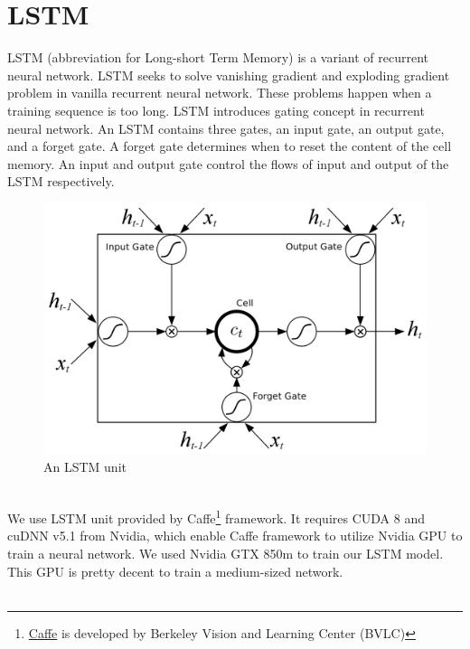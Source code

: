 \section{LSTM}
LSTM (abbreviation for Long-short Term Memory) is a variant of recurrent neural network. LSTM seeks to solve vanishing gradient and exploding gradient problem in vanilla recurrent neural network. These problems happen when a training sequence is too long. LSTM introduces gating concept in recurrent neural network. An LSTM contains three gates, an input gate, an output gate, and a forget gate. A forget gate determines when to reset the content of the cell memory. An input and output gate control the flows of input and output of the LSTM respectively.
\begin{figure}[h]
	\centering
	\includegraphics[width=0.85 \textwidth]{assets/lstm.png}
	\caption{An LSTM unit}
	\label{fig:lstm}
\end{figure} \\
We use LSTM unit provided by Caffe\footnote{\href{https://github.com/BVLC/caffe}{Caffe} is developed by Berkeley Vision and Learning Center (BVLC)} framework. It requires CUDA 8 and cuDNN v5.1 from Nvidia, which enable Caffe framework to utilize Nvidia GPU to train a neural network. We used Nvidia GTX 850m to train our LSTM model. This GPU is pretty decent to train a medium-sized network. \\ \\
